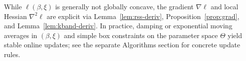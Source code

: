 \begin{remark}
While \(\ell(\beta,\xi)\) is generally not globally concave, the gradient \(\nabla \ell\) and local Hessian \(\nabla^2\ell\) are explicit via Lemma~\ref{lem:rss-deriv},
Proposition~\ref{prop:grad}, and Lemma~\ref{lem:kband-deriv}.
In practice, damping or exponential moving averages in \((\beta,\xi)\) and simple box constraints on the parameter space \(\Theta\) yield stable online updates; see the separate Algorithms section for concrete update rules.
\end{remark}





